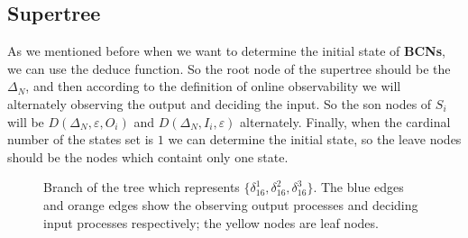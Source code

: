 \documentclass[letterpaper, 10 pt, conference]{ieeeconf}  %
\begin{document}
\subsection{Supertree} As we mentioned before when we want to determine the initial state of {\bf BCNs}, we can use the deduce function. So the root node of the supertree should be the $\Delta_N$, and then according to the definition of online observability we will alternately observing the output and deciding the input. So the son nodes of $S_i$ will be $D\left(\Delta_N,\varepsilon, O_i\right)$ and $D\left(\Delta_N,I_i,\varepsilon\right)$ alternately. Finally, when the  cardinal number of the states set is $1$ we can determine the initial state, so the leave nodes should be the nodes which containt only one state.
  \begin{figure}[thpb]
      \centering
      
      \caption{Branch of the tree which represents $\{\delta_{16}^1,\delta_{16}^2,\delta_{16}^3\}$. The blue edges and orange edges show the observing output processes and deciding input processes respectively; the yellow nodes are leaf nodes.}
      \label{fig:3}
   \end{figure}
\end{document}

